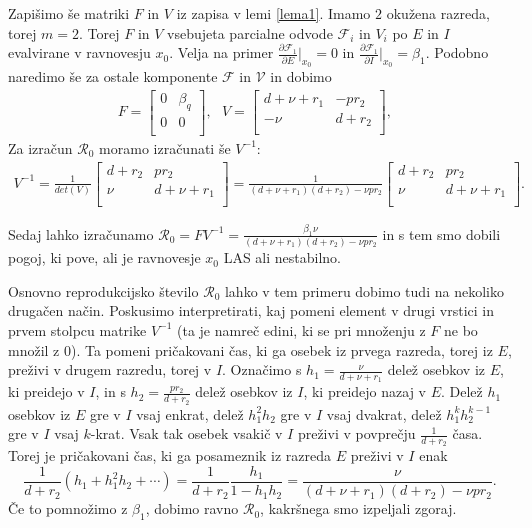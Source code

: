 \documentclass[a4paper,12pt]{article}
\newcommand{\R}{\mathcal R}
\newcommand{\F}{\mathcal F}
\newcommand{\V}{\mathcal V}
\begin{document}
Zapišimo še matriki \(F\) in \(V\) iz zapisa v lemi \ref{lema1}. Imamo \(2\) okužena razreda, torej \(m=2\). 
Torej \(F\) in \(V\) vsebujeta 
parcialne odvode \(\F_i\) in \(V_i\) po \(E\) in \(I\) evalvirane v ravnovesju \(x_0\). 
Velja na primer \(\frac{\partial \F_1}{\partial E}|_{x_0}=0\) in 
\(\frac{\partial \F_1}{\partial I}|_{x_0}=\beta_1\). Podobno naredimo še za ostale komponente \(\F\) in \(\V\) 
in dobimo 
\begin{align*}
    F= 
    \begin{bmatrix}
    0 & \beta_q \\
    0 & 0 \\
    \end{bmatrix},\textrm{ }
    V=
        \begin{bmatrix}
        d+\nu+r_1 & -pr_2 \\
        -\nu & d+r_2 \\
        \end{bmatrix},\textrm{ }
\end{align*}
Za izračun \(\R_0\) moramo izračunati še \(V^{-1}\):
\begin{align*}
    V^{-1}=\frac{1}{det(V)}
    \begin{bmatrix}
    d+r_2 & pr_2 \\
    \nu & d+\nu+r_1 \\
    \end{bmatrix}=
    \frac{1}{(d+\nu+r_1)(d+r_2)-\nu pr_2}
    \begin{bmatrix}
        d+r_2 & pr_2 \\
        \nu & d+\nu+r_1 \\
    \end{bmatrix}.
\end{align*}

Sedaj lahko izračunamo \(\R_0=FV^{-1}=\frac{\beta_1\nu}{(d+\nu+r_1)(d+r_2)-\nu pr_2}\) 
in s tem smo dobili pogoj, ki pove, ali je ravnovesje \(x_0\) LAS ali nestabilno.

Osnovno reprodukcijsko število \(\R_0\) lahko v tem primeru dobimo tudi na nekoliko 
drugačen način. Poskusimo interpretirati, kaj pomeni element v drugi vrstici in prvem stolpcu 
matrike \(V^{-1}\) (ta je namreč edini, ki se pri množenju z \(F\) ne bo množil z \(0\)). 
Ta pomeni pričakovani čas, ki ga osebek iz prvega razreda, torej iz \(E\), preživi v drugem razredu, torej v \(I\). 
Označimo s \(h_1=\frac{\nu}{d+\nu+r_1}\) delež osebkov iz \(E\), ki preidejo v \(I\), in s 
\(h_2=\frac{pr_2}{d+r_2}\) delež osebkov iz \(I\), ki preidejo nazaj v \(E\). 
Delež \(h_1\) osebkov iz \(E\) gre v \(I\) vsaj enkrat, delež \(h_1^2h_2\) gre v \(I\) vsaj dvakrat, 
delež \(h_1^{k}h_2^{k-1}\) gre v \(I\) vsaj \(k\)-krat. 
Vsak tak osebek vsakič v \(I\) preživi v povprečju \(\frac{1}{d+r_2}\) časa. Torej je pričakovani čas, ki ga 
posameznik iz razreda \(E\) preživi v \(I\) enak 
\[\frac{1}{d+r_2}(h_1+h_1^2h_2+\cdots)=\frac{1}{d+r_2}\frac{h_1}{1-h_1h_2}=\frac{\nu}{(d+\nu+r_1)(d+r_2)-\nu pr_2}.\]
Če to pomnožimo z \(\beta_1\), dobimo ravno \(\R_0\), kakršnega smo izpeljali zgoraj.
\end{document}

